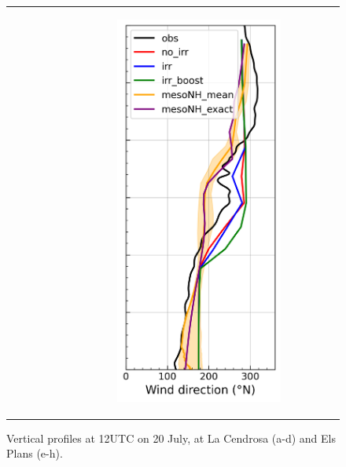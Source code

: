 \begin{figure}[hbtp]
{\begin{tabular}{@{}cccc@{}}
\begin{subfigure}[t]{0.283\textwidth}
        \end{subfigure} &
        \begin{subfigure}[t]{0.283\textwidth}
            \caption{}
            \includegraphics[width=\textwidth]{images/chap5/profiles/profile_elsplans_wind_direction_2007_.png}
        \end{subfigure} \\
    \end{tabular}
    }
    \caption{Vertical profiles at 12UTC on 20 July, at La Cendrosa (a-d) and Els Plans (e-h).}
    \label{fig:profiles_cendrosa_2007}
\end{figure}

